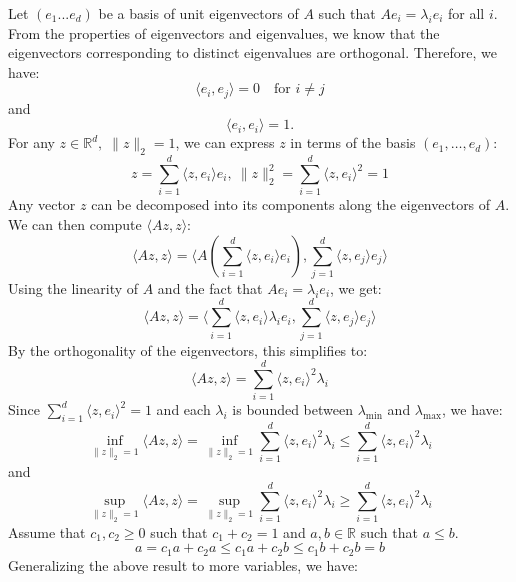 \begin{answer}
    \rpos 
    \begin{answerenum}
        \item Let \( (e_1 ... e_d) \) be a basis of unit eigenvectors of \(A\) such that \(A e_i = \lambda_i e_i\) for all \(i\). 
            From the properties of eigenvectors and eigenvalues, we know that the eigenvectors corresponding to distinct eigenvalues are orthogonal. 
            Therefore, we have:
            \[
            \langle e_i, e_j \rangle = 0 \quad \text{for } i \neq j
            \]
            and
            \[
            \langle e_i, e_i \rangle = 1.
            \]
            For any \(z \in \mathbb{R}^d, \; \| z \|_2=1  \), we can express \(z\) in terms of the basis \( (e_1, \ldots, e_d) \):
            \[
            z = \sum_{i=1}^d \langle z, e_i \rangle e_i,  \: \|z\|_2^2 = \sum_{i=1}^d \langle z, e_i \rangle^2 = 1
            \]
            Any vector \(z\) can be decomposed into its components along the eigenvectors of \(A\).
            We can then compute \( \langle Az, z \rangle \):
            \[
            \langle Az, z \rangle = \langle A\left(\sum_{i=1}^d \langle z, e_i \rangle e_i\right), \sum_{j=1}^d \langle z, e_j \rangle e_j \rangle
            \]
            Using the linearity of \(A\) and the fact that \(Ae_i = \lambda_i e_i\), we get:
            \[
            \langle Az, z \rangle = \langle \sum_{i=1}^d \langle z, e_i \rangle \lambda_i e_i, \sum_{j=1}^d \langle z, e_j \rangle e_j \rangle
            \]
            By the orthogonality of the eigenvectors, this simplifies to:
            \[
            \langle Az, z \rangle = \sum_{i=1}^d \langle z, e_i \rangle^2 \lambda_i
            \]
            Since \( \sum_{i=1}^d \langle z, e_i \rangle^2 = 1 \) and each \( \lambda_i \) is bounded between \( \lambda_{\min} \) and \( \lambda_{\max} \), we have:
            \[
            \inf_{\|z\|_2=1} \langle Az, z \rangle = \inf_{\|z\|_2=1} \sum_{i=1}^d \langle z, e_i \rangle^2 \lambda_i \leq \sum_{i=1}^d \langle z, e_i \rangle^2 \lambda_i
            \]
            and
            \[
            \sup_{\|z\|_2=1} \langle Az, z \rangle = \sup_{\|z\|_2=1} \sum_{i=1}^d \langle z, e_i \rangle^2 \lambda_i \geq \sum_{i=1}^d \langle z, e_i \rangle^2 \lambda_i
            \]
            Assume that \(c_1, c_2 \geq 0\) such that \(c_1 + c_2 = 1\) and \(a, b \in \mathbb{R}\) such that \(a \leq b\). 
            \[ 
            a = c_1 a + c_2 a \leq c_1 a + c_2 b \leq c_1 b + c_2 b = b 
            \]
            Generalizing the above result to more variables, we have:

\end{answerenum}
\end{answer}
